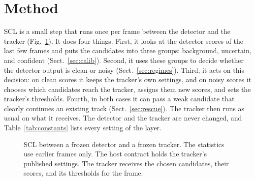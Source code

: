 \documentclass[pdflatex,sn-mathphys-num]{sn-jnl}
\newcommand{\scl}{SCL}
\begin{document}
\section{Method}\label{sec:method}

\scl{} is a small step that runs once per frame between the detector and the
tracker (Fig.~\ref{fig:arch}). It does four things. First, it looks at the
detector scores of the last few frames and puts the candidates into three
groups: background, uncertain, and confident (Sect.~\ref{sec:calib}).
Second, it uses these groups to decide whether the detector output is clean
or noisy (Sect.~\ref{sec:regimes}). Third, it acts on this decision: on
clean scores it keeps the tracker's own settings, and on noisy scores it
chooses which candidates reach the tracker, assigns them new scores, and sets
the tracker's thresholds. Fourth, in both cases it can pass a weak candidate
that clearly continues an existing track (Sect.~\ref{sec:rescue}). The
tracker then runs as usual on what it receives. The detector and the tracker
are never changed, and Table~\ref{tab:constants} lists every setting of the
layer.

\begin{figure}[t]
\centering
{}
\caption{\scl{} between a frozen detector
and a frozen tracker. The statistics use earlier frames only. The host
contract holds the tracker's published settings. The tracker receives the
chosen candidates, their scores, and its thresholds for the frame.}
\label{fig:arch}
\end{figure}
\end{document}
